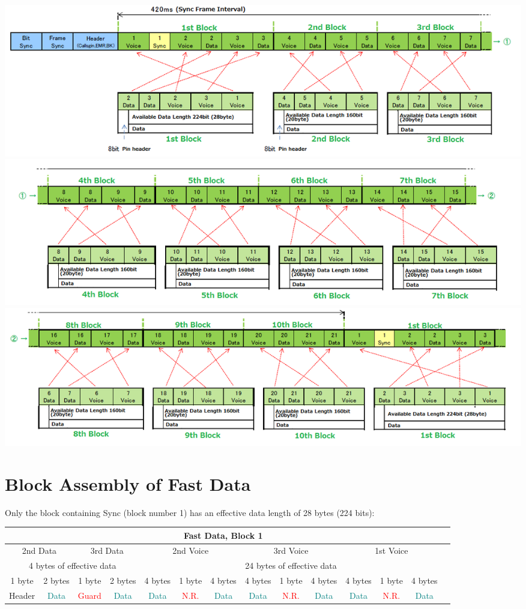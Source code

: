 \documentclass[10pt]{report}
\begin{document}
\includegraphics[scale=0.6]{1-3} \\
\includegraphics[scale=0.6]{4-7} \\
\includegraphics[scale=0.6]{8-10}

\section{Block Assembly of Fast Data}

Only the block containing Sync (block number 1) has an effective data
length of 28 bytes (224 bits):

\small{}
\begin{tabular}{|c|c|c|c|c|c|c|c|c|c|c|c|c|c|}
  \hline
  \multicolumn{13}{|c|}{\textbf{Fast Data, Block 1}} \\
  \hline
  \multicolumn{2}{|c|}{2nd Data} &
  \multicolumn{2}{|c|}{3rd Data} &
  \multicolumn{3}{|c|}{2nd Voice} &
  \multicolumn{3}{|c|}{3rd Voice} &
  \multicolumn{3}{|c|}{1st Voice} \\
  \hline
  \multicolumn{4}{|c|}{4 bytes of effective data} &
  \multicolumn{9}{|c|}{24 bytes of effective data} \\
  \hline
  1 byte & 2 bytes &
  1 byte & 2 bytes &
  4 bytes & 1 byte & 4 bytes &
  4 bytes & 1 byte & 4 bytes &
  4 bytes & 1 byte & 4 bytes \\
  \hline
  Header & \textcolor{teal}{Data} &
  \textcolor{red}{Guard} & \textcolor{teal}{Data} &
  \textcolor{teal}{Data} & \textcolor{red}{N.R.} & \textcolor{teal}{Data} &
  \textcolor{teal}{Data} & \textcolor{red}{N.R.} & \textcolor{teal}{Data} &
  \textcolor{teal}{Data} & \textcolor{red}{N.R.} & \textcolor{teal}{Data} \\
  \hline
\end{tabular}
\normalsize{}
\end{document}
